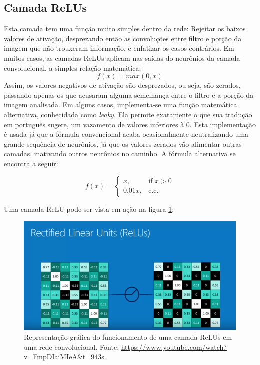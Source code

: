 \documentclass[
	12pt,				%
	oneside,			%
	a4paper,			%
	english,			%
	french,				%
	spanish,			%
	brazil,				%
	]{abntex2}
\begin{document}
\subsection{Camada ReLUs}
Esta camada tem uma função muito simples dentro da rede: Rejeitar os baixos valores de ativação, desprezando então as convoluções entre filtro e porção da imagem que não trouxeram informação, e enfatizar os casos contrários. Em muitos casos, as camadas ReLUs aplicam nas saídas do neurônios da camada convolucional, a simples relação matemática:
\begin{equation}
	f(x) = max(0,x)
	\label{eq_relus}
\end{equation}
Assim, os valores negativos de ativação são desprezados, ou seja, são zerados, passando apenas os que acusaram alguma semelhança entre o filtro e a porção da imagem analisada. Em alguns casos, implementa-se uma função matemática alternativa, conhecidada como \textit{leaky}. Ela permite exatamente o que sua tradução em português sugere, um vazamento de valores inferiores à \(0\). Esta implementação é usada já que a fórmula convencional acaba ocasionalmente neutralizando uma grande sequência de neurônios, já que os valores zerados vão alimentar outras camadas, inativando outros neurônios no caminho. A fórmula alternativa se encontra a seguir:

\[
f(x)= 
\begin{cases}
x,& \text{if } x > 0  \\      
0.01x,& \text{c.c.}
\end{cases}
\]

Uma camada ReLU pode ser vista em ação na figura \ref{relus}:

\begin{figure}[H]
	\centering
	\includegraphics[width=.8\textwidth]{imagens/relus}
	\caption{Representação gráfica do funcionamento de uma camada ReLUs em uma rede convolucional. Fonte: \href{https://www.youtube.com/watch?v=FmpDIaiMIeA\&t=943s}{https://www.youtube.com/watch?v=FmpDIaiMIeA\&t=943s}.}
	\label{relus}
\end{figure} 
\end{document}
